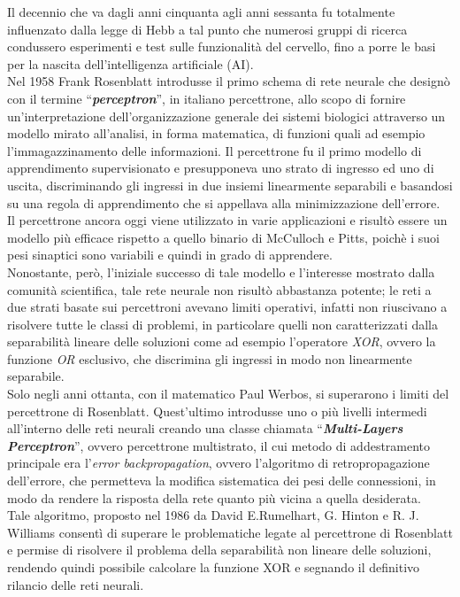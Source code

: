 \documentclass[12pt,a4paper,oneside]{book}
\begin{document}
	    Il decennio che va dagli anni cinquanta agli anni sessanta fu totalmente influenzato dalla legge di Hebb a tal punto che numerosi gruppi di ricerca condussero esperimenti e test sulle funzionalità del cervello, fino a porre le basi per la nascita dell'intelligenza artificiale (AI).\\
	    Nel 1958 Frank Rosenblatt introdusse il primo schema di rete neurale che designò con il termine ``\textbf{\emph{perceptron}}'', in italiano percettrone, allo scopo di fornire un'interpretazione dell'organizzazione generale dei sistemi biologici attraverso un modello mirato all'analisi, in forma matematica, di funzioni quali ad esempio l'immagazzinamento delle informazioni. Il percettrone fu il primo modello di apprendimento supervisionato e presupponeva uno strato di ingresso ed uno di uscita, discriminando gli ingressi in due insiemi linearmente separabili e basandosi su una regola di apprendimento che si appellava alla minimizzazione dell'errore.\\
	    Il percettrone ancora oggi viene utilizzato in varie applicazioni e risultò essere un modello più efficace rispetto a quello binario di McCulloch e Pitts, poichè i suoi pesi sinaptici sono variabili e quindi in grado di apprendere.\\
		Nonostante, però, l'iniziale successo di tale modello e l'interesse mostrato dalla comunità scientifica, tale rete neurale non risultò abbastanza potente; le reti a due strati basate sui percettroni avevano limiti operativi, infatti non riuscivano a risolvere tutte le classi di problemi, in particolare quelli non caratterizzati dalla separabilità lineare delle soluzioni come ad esempio l'operatore \emph{XOR}, ovvero la funzione \emph{OR} esclusivo, che discrimina gli ingressi in modo non linearmente separabile.\\
		Solo negli anni ottanta, con il matematico Paul Werbos, si superarono i limiti del percettrone di Rosenblatt.  Quest'ultimo introdusse uno o più livelli intermedi all'interno delle reti neurali creando una classe chiamata  ``\textbf{\emph{Multi-Layers Perceptron}}'', ovvero percettrone multistrato, il cui metodo di addestramento principale era l'\emph{error backpropagation}, ovvero l'algoritmo di retropropagazione dell'errore, che permetteva la modifica sistematica dei pesi delle connessioni, in modo da rendere la risposta della rete quanto più vicina a quella desiderata.\\
		Tale algoritmo, proposto nel 1986 da David E.Rumelhart, G. Hinton e R. J. Williams consentì di superare le problematiche legate al percettrone di Rosenblatt e permise di risolvere il problema della separabilità non lineare delle soluzioni, rendendo quindi possibile calcolare la funzione XOR e segnando il definitivo rilancio delle reti neurali.
		
\end{document}
